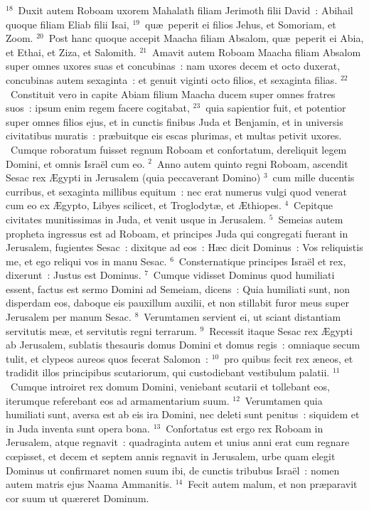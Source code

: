 ${}^{18}$~Duxit autem Roboam uxorem Mahalath filiam Jerimoth filii David~: Abihail quoque filiam Eliab filii Isai,
${}^{19}$~qu\ae\ peperit ei filios Jehus, et Somoriam, et Zoom.
${}^{20}$~Post hanc quoque accepit Maacha filiam Absalom, qu\ae\ peperit ei Abia, et Ethai, et Ziza, et Salomith.
${}^{21}$~Amavit autem Roboam Maacha filiam Absalom super omnes uxores suas et concubinas~: nam uxores decem et octo duxerat, concubinas autem sexaginta~: et genuit viginti octo filios, et sexaginta filias.
${}^{22}$~Constituit vero in capite Abiam filium Maacha ducem super omnes fratres suos~: ipsum enim regem facere cogitabat,
${}^{23}$~quia sapientior fuit, et potentior super omnes filios ejus, et in cunctis finibus Juda et Benjamin, et in universis civitatibus muratis~: pr\ae buitque eis escas plurimas, et multas petivit uxores.
~Cumque roboratum fuisset regnum Roboam et confortatum, dereliquit legem Domini, et omnis Isra\"el cum eo.
${}^{2}$~Anno autem quinto regni Roboam, ascendit Sesac rex \AE gypti in Jerusalem (quia peccaverant Domino)
${}^{3}$~cum mille ducentis curribus, et sexaginta millibus equitum~: nec erat numerus vulgi quod venerat cum eo ex \AE gypto, Libyes scilicet, et Troglodyt\ae , et \AE thiopes.
${}^{4}$~Cepitque civitates munitissimas in Juda, et venit usque in Jerusalem.
${}^{5}$~Semeias autem propheta ingressus est ad Roboam, et principes Juda qui congregati fuerant in Jerusalem, fugientes Sesac~: dixitque ad eos~: H\ae c dicit Dominus~: Vos reliquistis me, et ego reliqui vos in manu Sesac.
${}^{6}$~Consternatique principes Isra\"el et rex, dixerunt~: Justus est Dominus.
${}^{7}$~Cumque vidisset Dominus quod humiliati essent, factus est sermo Domini ad Semeiam, dicens~: Quia humiliati sunt, non disperdam eos, daboque eis pauxillum auxilii, et non stillabit furor meus super Jerusalem per manum Sesac.
${}^{8}$~Verumtamen servient ei, ut sciant distantiam servitutis me\ae , et servitutis regni terrarum.
${}^{9}$~Recessit itaque Sesac rex \AE gypti ab Jerusalem, sublatis thesauris domus Domini et domus regis~: omniaque secum tulit, et clypeos aureos quos fecerat Salomon~:
${}^{10}$~pro quibus fecit rex \ae neos, et tradidit illos principibus scutariorum, qui custodiebant vestibulum palatii.
${}^{11}$~Cumque introiret rex domum Domini, veniebant scutarii et tollebant eos, iterumque referebant eos ad armamentarium suum.
${}^{12}$~Verumtamen quia humiliati sunt, aversa est ab eis ira Domini, nec deleti sunt penitus~: siquidem et in Juda inventa sunt opera bona.
${}^{13}$~Confortatus est ergo rex Roboam in Jerusalem, atque regnavit~: quadraginta autem et unius anni erat cum regnare cœpisset, et decem et septem annis regnavit in Jerusalem, urbe quam elegit Dominus ut confirmaret nomen suum ibi, de cunctis tribubus Isra\"el~: nomen autem matris ejus Naama Ammanitis.
${}^{14}$~Fecit autem malum, et non pr\ae paravit cor suum ut qu\ae reret Dominum.


